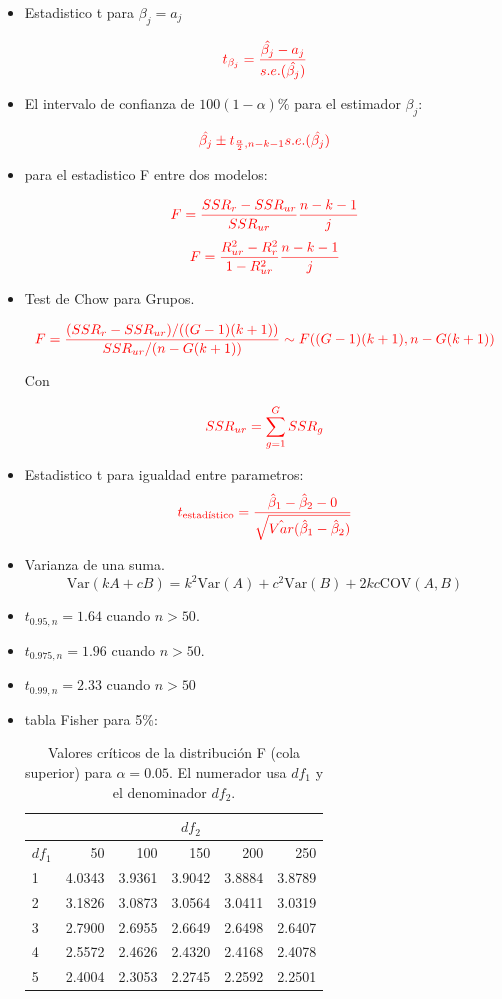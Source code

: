 \documentclass[10pt,a4paper]{article}
\begin{document}
\begin{itemize}

\item Estadistico t para $\beta_j = a_j$

$$\color{red}{t_{\beta_j}=\frac{\hat{\beta_j}-a_j}{s.e.(\hat{\beta_j})}}$$

\item El intervalo de confianza de $100(1-\alpha)\%$ para el estimador $\beta_j$:

$${\color{red}\hat{\beta_j} \pm t_{\frac{\alpha}{2},n-k-1}s.e.(\hat{\beta_j})}$$


\item para el estadistico F entre dos modelos:

$$\color{red}{F=\frac{SSR_r-SSR_{ur}}{SSR_{ur}}\frac{n-k-1}{j}}$$
$$\color{red}{F=\frac{R^2_{ur}-R^2_{r}}{1-R^2_{ur}}\frac{n-k-1}{j}}$$

\item Test de Chow para Grupos.

    \[\color{red}
    F = \frac{(SSR_r - SSR_{ur}) / ((G - 1)(k + 1))}{SSR_{ur} / (n - G(k + 1))} \sim F((G - 1)(k + 1), n - G(k + 1))
    \]

Con

$$\color{red}SSR_{ur} = \sum_{g=1}^G SSR_g$$

\item Estadistico t para igualdad entre parametros:
 \[\color{red}t_{\text{estadístico}} = \frac{\hat{\beta}_1 - \hat{\beta}_2 - 0}{\sqrt{\hat{Var}(\hat{\beta}_1 - \hat{\beta}_2)}}\]


\item  Varianza de una suma.
{\color{red}
$$\text{Var}(kA + cB) = k^2\text{Var}(A) + c^2\text{Var}(B) + 2kc\text{COV}(A, B)$$}

\item $t_{0.95,n} = 1.64$ cuando $n >50$.
\item $t_{0.975,n} = 1.96$ cuando $n >50$.
\item $t_{0.99,n}=2.33$ cuando $n>50$


\item tabla Fisher para 5\%:
\begin{table}[H]
\centering
\caption{Valores críticos de la distribución F (cola superior) para $\alpha=0.05$. 
El numerador usa $df_1$ y el denominador $df_2$.}
\label{tab:Fcrit_5pct}
\begin{tabular}{|l|r|r|r|r|r|}
\toprule
\hline
& \multicolumn{5}{c|}{$df_2$} \\
\hline
$df_1$ & 50 & 100 & 150 & 200 & 250 \\
\hline
\midrule
1 & 4.0343 & 3.9361 & 3.9042 & 3.8884 & 3.8789 \\
\hline
2 & 3.1826 & 3.0873 & 3.0564 & 3.0411 & 3.0319 \\
\hline
3 & 2.7900 & 2.6955 & 2.6649 & 2.6498 & 2.6407 \\
\hline
4 & 2.5572 & 2.4626 & 2.4320 & 2.4168 & 2.4078 \\
\hline
5 & 2.4004 & 2.3053 & 2.2745 & 2.2592 & 2.2501 \\
\end{tabular}
\end{table}


\end{itemize}
\end{document}

